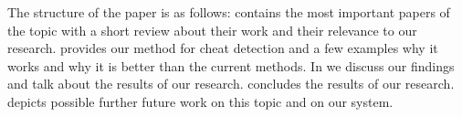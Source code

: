 The structure of the paper is as follows:  contains the most important papers of the topic with a short review about their work and their relevance to our research.
 provides our method for cheat detection and a few examples why it works and why it is better than the current methods.
In  we discuss our findings and talk about the results of our research.
 concludes the results of our research.
 depicts possible further future work on this topic and on our system.